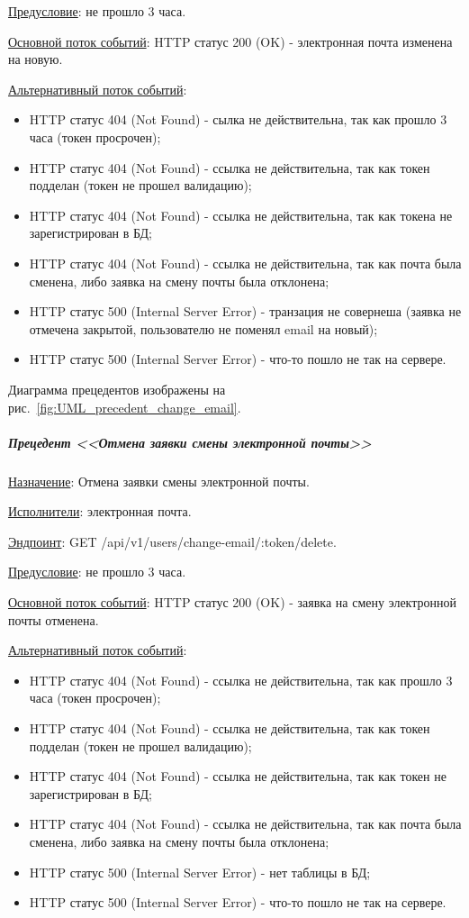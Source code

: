 \underline{Предусловие}: не прошло 3 часа.

\underline{Основной поток событий}: HTTP статус 200 (OK) - электронная почта изменена на новую.

\underline{Альтернативный поток событий}:

\begin{itemize}
    \item HTTP статус 404 (Not Found) - сылка не действительна, так как прошло 3 часа (токен просрочен);
    \item HTTP статус 404 (Not Found) - ссылка не действительна, так как токен подделан (токен не прошел валидацию);
    \item HTTP статус 404 (Not Found) - ссылка не действительна, так как токена не зарегистрирован в БД;
    \item HTTP статус 404 (Not Found) - ссылка не действительна, так как почта была сменена, либо заявка на смену почты была отклонена;
    \item HTTP статус 500 (Internal Server Error) - транзация не совернеша (заявка не отмечена закрытой, пользователю не поменял email на новый);
    \item HTTP статус 500 (Internal Server Error) - что-то пошло не так на сервере.
\end{itemize}

Диаграмма прецедентов изображены на рис.~\ref{fig:UML_precedent_change_email}.


\subparagraph{Прецедент <<Отмена заявки смены электронной почты>>} \hspace{0pt}

\underline{Назначение}: Отмена заявки смены электронной почты.

\underline{Исполнители}: электронная почта.

\underline{Эндпоинт}: GET /api/v1/users/change-email/:token/delete.

\underline{Предусловие}: не прошло 3 часа.

\underline{Основной поток событий}: HTTP статус 200 (OK) - заявка на смену электронной почты отменена.

\underline{Альтернативный поток событий}:

\begin{itemize}
    \item HTTP статус 404 (Not Found) - ссылка не действительна, так как прошло 3 часа (токен просрочен);
    \item HTTP статус 404 (Not Found) - ссылка не действительна, так как токен подделан (токен не прошел валидацию);
    \item HTTP статус 404 (Not Found) - ссылка не действительна, так как токен не зарегистрирован в БД;
    \item HTTP статус 404 (Not Found) - ссылка не действительна, так как почта была сменена, либо заявка на смену почты была отклонена;
    \item HTTP статус 500 (Internal Server Error) - нет таблицы в БД;
    \item HTTP статус 500 (Internal Server Error) - что-то пошло не так на сервере.
\end{itemize}

